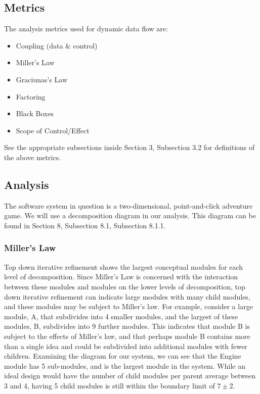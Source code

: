 \documentclass{article}
\begin{document}
	\subsection{Metrics}
		The analysis metrics used for dynamic data flow are:
			\begin{itemize}
				\item Coupling (data \& control)
				\item Miller's Law
				\item Graciunas's Law
				\item Factoring
				\item Black Boxes
				\item Scope of Control/Effect
			\end{itemize}
		See the appropriate subsections inside Section 3, Subsection 3.2 for definitions of the above metrics. 
	\subsection{Analysis}
		The software system in question is a two-dimensional, point-and-click adventure game. We will use a decomposition diagram in our analysis. This diagram can be found in Section 8, Subsection 8.1, Subsection 8.1.1. 
		\subsubsection{Miller's Law}
			Top down iterative refinement shows the largest conceptual modules for each level of decomposition. Since Miller's Law is concerned with the interaction between these modules and modules on the lower levels of decomposition, top down iterative refinement can indicate large modules with many child modules, and these modules may be subject to Miller's law. For example, consider a large module, A,  that subdivides into 4 smaller modules, and the largest of these modules, B, subdivides into 9 further modules. This indicates that module B is subject to the effects of Miller's law, and that perhaps module B contains more than a single idea and could be subdivided into additional modules with fewer children. Examining the diagram for our system, we can see that the Engine module has 5 sub-modules, and is the largest module in the system. While an ideal design would have the number of child modules per parent average between 3 and 4, having 5 child modules is still within the boundary limit of $7\pm2$. 
\end{document}

